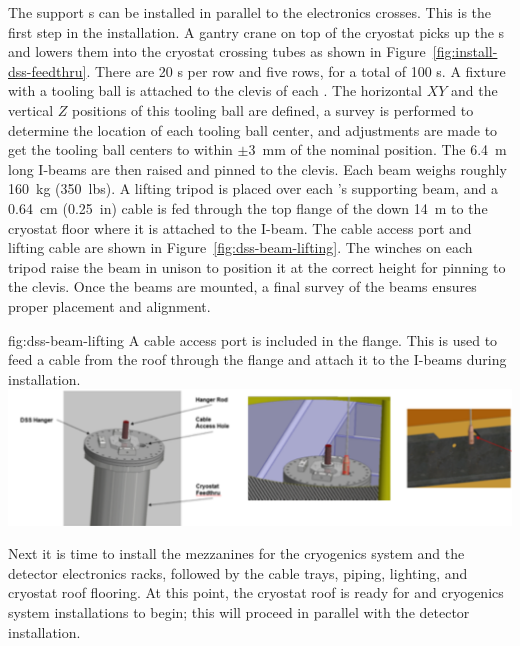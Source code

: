 The  support \fdth{}s can be installed in parallel to the  electronics crosses. This is the first step in the  installation. 
A gantry crane on top of the cryostat picks up the \fdth{}s  and lowers them into the cryostat crossing tubes as shown in Figure~\ref{fig:install-dss-feedthru}. 
There are \num{20} \fdth{}s per row and five rows, for a total of \num{100} \fdth{}s.  A fixture with a tooling ball is attached to the clevis of each \fdth{}.  
The horizontal $XY$ and the vertical $Z$ positions of this tooling ball are defined, a survey is performed to determine the location of each tooling ball center, and adjustments are made to get the tooling ball centers to within $\pm$\SI{3}{mm} of the nominal position.  
The \SI{6.4}{m} long I-beams are then raised and pinned to the clevis.  
Each beam weighs roughly \SI{160}{kg} (\SI{350}{lbs}). 
A lifting tripod is placed over each  \fdth{}'s supporting beam, and a \SI{0.64}{cm} (\SI{0.25}{in})  cable is fed through the top flange of the \fdth down \SI{14}{m} to the cryostat floor where it is attached to the I-beam. 
The cable access port and lifting cable are shown in Figure~\ref{fig:dss-beam-lifting}. 
The winches on each tripod raise the beam in unison to position it at the correct height for pinning to the \fdth clevis.  Once the beams are mounted, a final survey of the beams ensures proper placement and alignment. 
 \begin{dunefigure}{fig:dss-beam-lifting}
  {A cable access port is included in the  flange. This is used to feed a cable from the roof through the flange and attach it to the I-beams during  installation.}
 \includegraphics[width=.95\textwidth]{graphics/dss-beam-lifting.pdf}
\end{dunefigure}


Next it is time to install the mezzanines for the cryogenics system and the detector electronics racks, followed by the cable trays,  piping, lighting, and cryostat roof flooring. At this point, the cryostat roof is ready for  and cryogenics system installations to begin; this will proceed in parallel with the detector installation.






